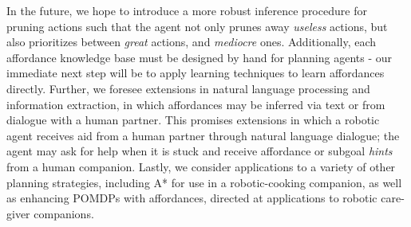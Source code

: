 \documentclass[]{article}
\begin{document}
In the future, we hope to introduce a more robust inference procedure for pruning actions such that
the agent not only prunes away {\it useless} actions, but also prioritizes between
{\it great} actions, and {\it mediocre} ones. Additionally, each affordance knowledge base
must be designed by hand for planning agents - our immediate next step will be to
apply learning techniques to learn affordances directly.
Further, we foresee extensions in natural language processing and information
extraction, in which affordances may be inferred via text or from dialogue with a human partner.
This promises extensions in which a robotic agent receives aid from a human partner through natural language
dialogue; the agent may ask for help when it is stuck and
receive affordance or subgoal {\it hints} from a human companion. Lastly, we consider applications to a variety of other planning
strategies, including A* for use in a robotic-cooking companion, as well as enhancing POMDPs with affordances, directed at applications to robotic care-giver companions.
{\small

  
}
\end{document}
